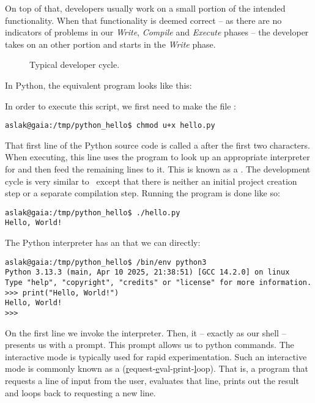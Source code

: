 On top of that, developers usually work on a small portion of the intended functionality. When that functionality is deemed correct -- as there are no indicators of problems in our \textsl{Write}, \textsl{Compile} and \textsl{Execute} phases -- the developer takes on an other portion and starts in the \textsl{Write} phase.

\begin{figure}[tbp]
  
  \caption{Typical developer cycle.}
  \label{fig:first:phases:cycle}
\end{figure}

\label{sec:first:python}

In Python, the equivalent program looks like this:


In order to execute this script, we first need to make the file :
\begin{verbatim}
aslak@gaia:/tmp/python_hello$ chmod u+x hello.py
\end{verbatim}

That first line of the Python source code is called a  after the first two characters. When executing, this line uses the  program to look up an appropriate interpreter for  and then feed the remaining lines to it. This is known as a . The development cycle is very similar to \csharp\ except that there is neither an initial project creation step or a separate compilation step. Running the program is done like so:

\begin{verbatim}
aslak@gaia:/tmp/python_hello$ ./hello.py
Hello, World!
\end{verbatim}

The Python interpreter has an  that we can  directly:

\begin{verbatim}
aslak@gaia:/tmp/python_hello$ /bin/env python3
Python 3.13.3 (main, Apr 10 2025, 21:38:51) [GCC 14.2.0] on linux
Type "help", "copyright", "credits" or "license" for more information.
>>> print("Hello, World!")
Hello, World!
>>> 
\end{verbatim}

On the first line we invoke the interpreter. Then, it -- exactly as our shell -- presents us with a prompt. This prompt allows us to  python commands. The interactive mode is typically used for rapid experimentation. Such an interactive mode is commonly known as a  (\underline{r}equest-\underline{e}val-\underline{p}rint-\underline{l}oop). That is, a program that requests a line of input from the user, evaluates that line, prints out the result and loops back to requesting a new line.

